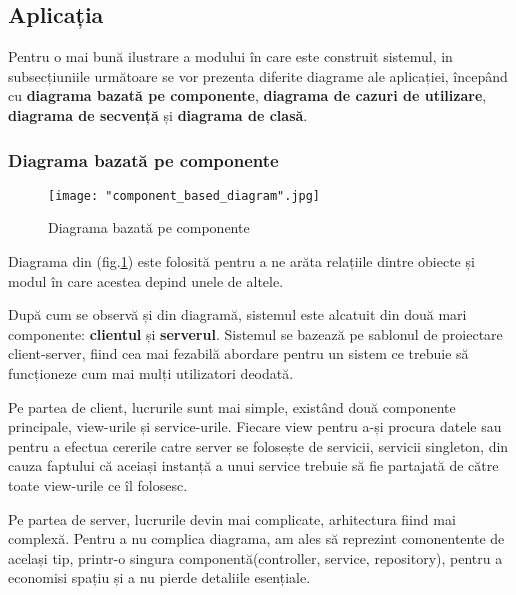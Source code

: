 \documentclass[a4paper, 12pt]{article}
\begin{document}
	\subsection{Aplicația}
	\bigskip
	\quad\space Pentru o mai bună ilustrare a modului în care este construit sistemul, in subsecțiuniile următoare se vor prezenta diferite diagrame ale aplicației, începând cu \textbf{diagrama bazată pe componente}, \textbf{diagrama de cazuri de utilizare}, \textbf{diagrama de secvență} și \textbf{diagrama de clasă}. 
	\subsubsection{Diagrama bazată pe componente}
	\begin{figure}[H]
		\centering
		\texttt{[image: "component\_based\_diagram".jpg]}
		\caption{Diagrama bazată pe componente}\label{fig:component}
	\end{figure}
	
	
	
	\quad \space Diagrama din (fig.\ref{fig:component}) este folosită pentru a ne arăta relațiile dintre obiecte și modul în care acestea depind unele de altele.
	
	După cum se observă și din diagramă, sistemul este alcatuit din două mari componente: \textbf{clientul} și \textbf{serverul}. Sistemul se bazează pe sablonul de proiectare client-server, fiind cea mai fezabilă abordare pentru un sistem ce trebuie să funcționeze cum mai mulți utilizatori deodată.
	
	Pe partea de client, lucrurile sunt mai simple, existând două componente principale, view-urile și service-urile. Fiecare view pentru a-și procura datele sau pentru a efectua cererile catre server se folosește de servicii, servicii singleton, din cauza faptului că aceiași instanță a unui service trebuie să fie partajată de către toate view-urile ce îl folosesc.
	
	Pe partea de server, lucrurile devin mai complicate, arhitectura fiind mai complexă. Pentru a nu complica diagrama, am ales să reprezint comonentente de același tip, printr-o singura componentă(controller, service, repository), pentru a economisi spațiu și a nu pierde detaliile esențiale.
	
\end{document}
